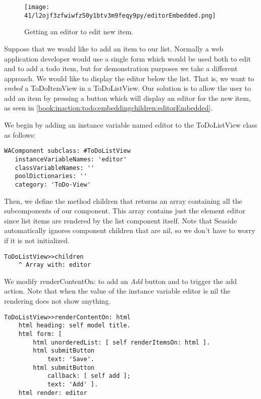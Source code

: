 \documentclass[a4paper,10pt,twoside]{book}
\newcommand{\ct}[1]{{\small\ttfamily\textup{#1}}}
\begin{document}
\begin{figure}[h!tbp]
	\begin{center}
		\texttt{[image: 41/l2ojf3zfwiwfz50y1btv3m9feqy9py/editorEmbedded.png]}
		\caption{Getting an editor to edit new item.\label{book:inaction:todo:embeddingchildren:editorEmbedded}}
	\end{center}
\end{figure}


Suppose that we would like to add an item to our list. Normally a web application developer would use a single form which would be used both to edit and to add a todo item, but for demonstration purposes we take a different approach. We would like to display the editor below the list. That is, we want to \textit{embed} a \ct{ToDoItemView} in a \ct{ToDoListView}. Our solution is to allow the user to add an item by pressing a button which will display an editor for the new item, as seen in \autoref{book:inaction:todo:embeddingchildren:editorEmbedded}. 

We begin by adding an instance variable named \ct{editor} to the \ct{ToDoListView} class as follows:

\begin{lstlisting}
WAComponent subclass: #ToDoListView
   instanceVariableNames: 'editor'
   classVariableNames: ''
   poolDictionaries: ''
   category: 'ToDo-View'
\end{lstlisting}

Then, we define the method \ct{children} that returns an array containing all the subcomponents of our component. This array contains just the element \ct{editor} since list items are rendered by the list component itself. Note that Seaside automatically ignores component children that are nil, so we don't have to worry if it is not initialized.

\begin{lstlisting}
ToDoListView>>children
    ^ Array with: editor
\end{lstlisting}

We modify \ct{renderContentOn:} to add an \textit{Add} button and to trigger the add action. Note that when the value of the instance variable \ct{editor} is nil the rendering does not show anything.

\begin{lstlisting}
ToDoListView>>renderContentOn: html
    html heading: self model title.
    html form: [
        html unorderedList: [ self renderItemsOn: html ].
        html submitButton
            text: 'Save'.
        html submitButton
            callback: [ self add ];
            text: 'Add' ].
    html render: editor
\end{lstlisting}
\end{document}
